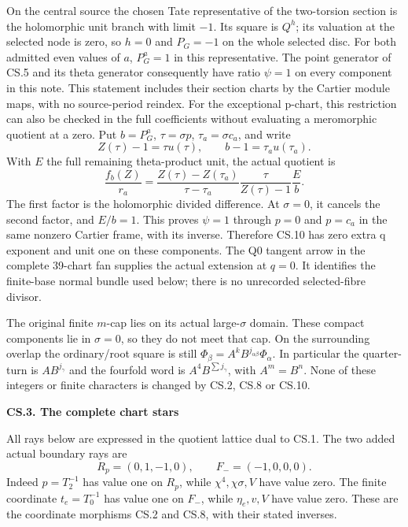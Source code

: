 On the central source the chosen Tate representative of
the two-torsion section is the holomorphic unit branch
with limit \(-1\). Its square is \(Q^h\); its valuation at
the selected node is zero, so \(h=0\) and \(P_G=-1\)
on the whole selected disc. For both admitted even values
of \(a\), \(P_G^a=1\) in this representative. The point
generator of CS.5 and its theta generator consequently
have ratio \(\psi=1\) on every component in this note.
This statement includes their section charts by the
Cartier module maps, with no source-period reindex.
For the exceptional p-chart, this restriction can
also be checked in the full coefficients without
evaluating a meromorphic quotient at a zero. Put
\(b=P_G^a\), \(\tau=\sigma p\),
\(\tau_a=\sigma c_a\), and write
\[
 Z(\tau)-1=\tau u(\tau),\qquad
 b-1=\tau_a u(\tau_a).
\]
With \(E\) the full remaining theta-product unit,
the actual quotient is
\[
 \frac{f_b(Z)}{r_a}
 =\frac{Z(\tau)-Z(\tau_a)}{\tau-\tau_a}
   \frac{\tau}{Z(\tau)-1}\frac{E}{b}.
 \tag{CS.10a}
\]
The first factor is the holomorphic divided
difference. At \(\sigma=0\), it cancels the
second factor, and \(E/b=1\). This proves
\(\psi=1\) through \(p=0\) and \(p=c_a\) in
the same nonzero Cartier frame, with its inverse.
Therefore CS.10 has zero extra q exponent and unit one
on these components. The Q0 tangent arrow in the complete
39-chart fan supplies the actual extension at \(q=0\).
It identifies the finite-base normal bundle used below;
there is no unrecorded selected-fibre divisor.

The original finite \(m\)-cap lies on its actual large-\(\sigma\)
domain. These compact components lie in \(\sigma=0\), so
they do not meet that cap. On the surrounding overlap the
ordinary/root square is still
\(\Phi_\beta=A^kB^{j_{\alpha\beta}}\Phi_\alpha\).
In particular the quarter-turn is \(AB^{j_\gamma}\) and
the fourfold word is \(A^4B^{\sum j_\gamma}\), with
\(A^m=B^n\). None of these integers or finite characters
is changed by CS.2, CS.8 or CS.10.

\par

\medskip\noindent\textbf{CS.3. The complete chart stars}

\par\nobreak

All rays below are expressed in the quotient lattice dual
to CS.1. The two added actual boundary rays are
\[
 R_p=(0,1,-1,0),\qquad F_-=(-1,0,0,0).
 \tag{CS.11}
\]
Indeed \(p=T_2^{-1}\) has value one on \(R_p\), while
\(\chi^4,\chi\sigma,V\) have value zero. The finite
coordinate \(t_e=T_0^{-1}\) has value one on \(F_-\),
while \(\eta_e,v,V\) have value zero. These are the
coordinate morphisms CS.2 and CS.8, with their stated
inverses.

